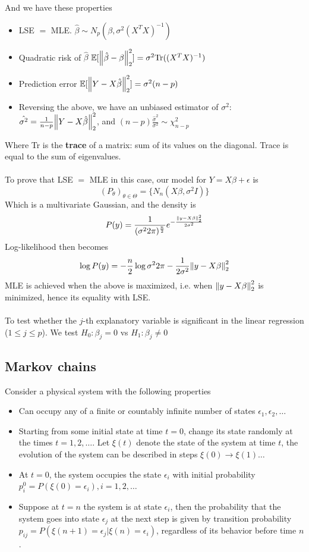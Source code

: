 \documentclass{article}
\begin{document}
And we have these properties
\begin{itemize}
  \item LSE $=$ MLE. $\hat{\beta} \sim \mathit{N}_p (\beta, \sigma^2 (X^T X)^{-1})$
  \item Quadratic risk of $\hat{\beta}$ $\mathbb{E}[\norm{\hat{\beta} - \beta}_2^2] = \sigma^2 \text{Tr}((X^T X)^{-1})$
  \item Prediction error $\mathbb{E}[\norm{Y - X \hat{\beta}}_2^2] = \sigma^2 (n - p)$
  \item Reversing the above, we have an unbiased estimator of $\sigma^2$: $\hat{\sigma^2} = \frac{1}{n - p} \norm{Y - X \hat{\beta}}_2^2$, and $(n - p) \frac{\hat{\sigma}^2}{\sigma^2} \sim \chi^2_{n - p}$
\end{itemize}

Where Tr is the \textbf{trace} of a matrix: sum of its values on the diagonal.
Trace is equal to the sum of eigenvalues.
\\
\\
To prove that LSE $=$ MLE in this case, our model for $Y = X \beta + \epsilon$ is
$$
(P_{\theta})_{\theta \in \Theta} = \{\mathit{N}_n(X \beta, \sigma^2 I)\}
$$
Which is a multivariate Gaussian, and the density is
$$
P(y) = \frac{1}{(\sigma^2 2 \pi)^{\frac{n}{2}}} e^{-\frac{\norm{y - X \beta}^2_2}{2 \sigma^2}}
$$
Log-likelihood then becomes
$$
\log{P(y)} = -\frac{n}{2} \log{\sigma^2 2 \pi} - \frac{1}{2 \sigma^2} \norm{y - X \beta}^2_2
$$
MLE is achieved when the above is maximized, i.e. when $\norm{y - X \beta}^2_2$ is minimized, hence its equality with LSE.
\\
\\

To test whether the $j$-th explanatory variable is significant in the linear regression ($1 \leq j \leq p$).
We test $H_0: \beta_j = 0$ vs $H_1: \beta_j \neq 0$

\subsection{Markov chains}

Consider a physical system with the following properties

\begin{itemize}
  \item Can occupy any of a finite or countably infinite number of states $\epsilon_1, \epsilon_2, \dots$
  \item Starting from some initial state at time $t = 0$, change its state randomly at the times $t = 1, 2, \dots$. Let $\xi(t)$ denote the state of the system at time $t$, the evolution of the system can be described in steps $\xi(0) \to \xi(1) \dots$
  \item At $t = 0$, the system occupies the state $\epsilon_i$ with initial probability $p^0_i = P(\xi(0) = \epsilon_i), i = 1, 2, \dots$
  \item Suppose at $t = n$ the system is at state $\epsilon_i$, then the probability that the system goes into state $\epsilon_j$ at the next step is given by transition probability $p_{ij} = P(\xi(n + 1) = \epsilon_j | \xi(n) = \epsilon_i)$, regardless of its behavior before time $n$.
\end{itemize}
\end{document}
